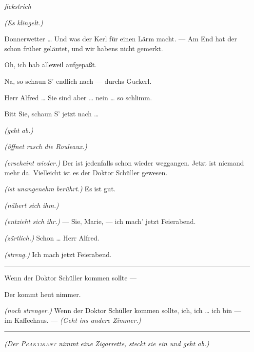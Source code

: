 \documentclass[
	final,
	a4paper,
	ngerman,
	mpinclude = true, %
	twoside = true,
	open = right,
	cleardoublepage = plain,
	DIV = 13,
	BCOR = 1cm,
	titlepage = firstiscover,
	]{scrbook}
\newcommand{\direction}[1]{\textit{(#1)}}
\newcommand{\hiat}{%
	\begin{center}
		\tiny
		\raisebox{0.5ex}{\rule{0.3\linewidth}{0.4pt}}
		\textit{fickstrich}
		\raisebox{0.5ex}{\rule{0.3\linewidth}{0.4pt}}
	\end{center}
}
\newenvironment{deletion}{%
		\vspace{0.25\baselineskip}
		\hrule
		\vspace{0.25\baselineskip}
		\color{darkgray}
	}{
		\color{black}
		\vspace{0.25\baselineskip}
		\hrule 
		\vspace{0.25\baselineskip}
	}
\newcommand{\thecharacter}[1]{\textup{\textsc{#1}}\xspace}
\newcommand{\thepraktikant}{\thecharacter{Praktikant}}
\newcommand{\theherr}{\thecharacter{Junger Herr}}
\newcommand{\character}[1]{\item[#1:]}
\newcommand{\praktikant}{\character{\thepraktikant}}
\newcommand{\herr}{\character{\theherr}}
\begin{document}
\begin{play}
	\hiat

	\direction{Es klingelt.}

	\herr
	Donnerwetter \ldots{} Und was der Kerl für einen Lärm macht. --- Am End hat der schon früher geläutet, und wir habens nicht gemerkt.

	\praktikant
	Oh, ich hab alleweil aufgepaßt.

	\herr
	Na, so schaun S' endlich nach --- durchs Guckerl.

	\praktikant
	Herr Alfred \ldots{} Sie sind aber \ldots{} nein \ldots{} so schlimm.

	\herr
	Bitt Sie, schaun S' jetzt nach \ldots{}

	\praktikant
	\direction{geht ab.}

	\herr
	\direction{öffnet rasch die Rouleaux.}

	\praktikant
	\direction{erscheint wieder.} Der ist jedenfalls schon wieder weggangen. Jetzt ist niemand mehr da. Vielleicht ist es der Doktor Schüller gewesen.

	\herr
	\direction{ist unangenehm berührt.} Es ist gut.

	\praktikant
	\direction{nähert sich ihm.}

	\herr
	\direction{entzieht sich ihr.} --- Sie, Marie, --- ich mach' jetzt Feierabend.

	\praktikant
	\direction{zärtlich.} Schon \ldots{} Herr Alfred.

	\herr
	\direction{streng.} Ich mach jetzt Feierabend.
	\begin{deletion}
		Wenn der Doktor Schüller kommen sollte ---

	\praktikant
	Der kommt heut nimmer.

	\herr
	\direction{noch strenger.} Wenn der Doktor Schüller kommen sollte, ich, ich \ldots{} ich bin --- im Kaffeehaus. --- \direction{Geht ins andere Zimmer.}
	\end{deletion}

	\direction{Der \thepraktikant{} nimmt eine Zigarrette, steckt sie ein und geht ab.}

\end{play}
\end{document}

